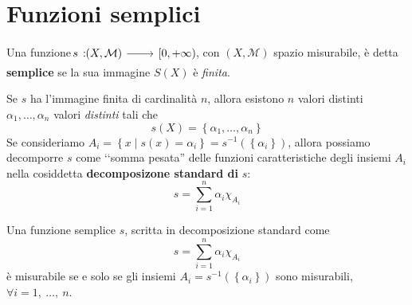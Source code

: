 \section{Funzioni semplici}
\begin{define}
Una funzione $\funz{s}{\left(X,\mathcal{M}\right)}{\left[0,+\infty\right)}$, con $\left(X,\mathcal{M}\right)$ spazio misurabile, è detta \textbf{semplice} se la sua immagine $S\left(X\right)$ è \textit{finita}.
\end{define}
Se $s$ ha l'immagine finita di cardinalità $n$, allora esistono $n$ valori distinti $\alpha_1,\ldots,\alpha_n$  valori \textit{distinti} tali che
\begin{equation*}
	s\left(X\right)=\left\{\alpha_1,\ldots,\alpha_n\right\}
\end{equation*}
Se consideriamo $A_i=\left\{x\mid s\left(x\right)=\alpha_i\right\}=s^{-1}\left(\left\{\alpha_i\right\}\right)$, allora possiamo decomporre $s$ come ‘‘somma pesata'' delle funzioni caratteristiche degli insiemi $A_i$ nella cosiddetta \textbf{decomposizone standard di }$s$:
\begin{equation}
	s=\sum_{i=1}^{n}\alpha_i\chi_{A_i}
\end{equation}
\begin{proposition}
	Una funzione semplice $s$, scritta in decomposizione standard come
	\begin{equation*}
		s=\sum_{i=1}^{n}\alpha_i\chi_{A_i}
	\end{equation*}
	è misurabile se e solo se gli insiemi $A_i=s^{-1}\left(\left\{\alpha_i\right\}\right)$ sono misurabili, $\forall i=1,\ \ldots,\ n$. 
\end{proposition}

